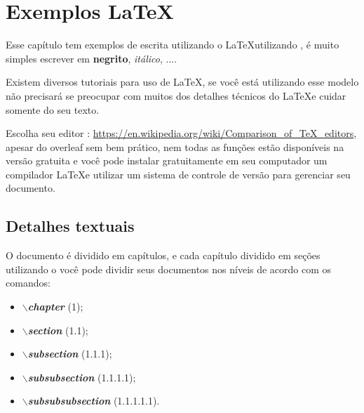 \chapter{Exemplos \LaTeX}
\label{cap-exemplos}

\newcommand{\mostraComandoLaTeX}[1]{\textbf{\emph{$\backslash$#1}}}



Esse capítulo tem exemplos de escrita utilizando o \LaTeX  utilizando \abnTeX, é muito simples escrever em \textbf{negrito}, \emph{itálico}, ....


Existem diversos tutoriais para uso de \LaTeX, se você está utilizando esse modelo não precisará se preocupar com muitos dos detalhes técnicos do \LaTeX \space e cuidar somente do seu texto.

Escolha seu editor : \url{https://en.wikipedia.org/wiki/Comparison\_of\_TeX\_editors}, apesar do overleaf sem bem prático, nem todas as funções estão disponíveis na versão gratuita e você pode instalar gratuitamente em seu computador um compilador \LaTeX \space e utilizar um sistema de controle de versão para gerenciar seu documento.




\section{Detalhes textuais}

O documento é dividido em capítulos, e cada capítulo dividido em seções utilizando o \abnTeX \space você pode dividir seus documentos nos níveis de acordo com os comandos:

\begin{itemize}
    \item \mostraComandoLaTeX{chapter}  (1);
    
    \item \mostraComandoLaTeX{section} (1.1);
    
    \item \mostraComandoLaTeX{subsection} (1.1.1);
    
    \item \mostraComandoLaTeX{subsubsection} (1.1.1.1);
    
    \item \mostraComandoLaTeX{subsubsubsection} (1.1.1.1.1).
    
\end{itemize}

